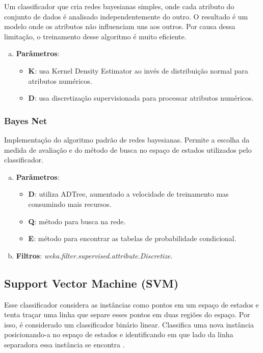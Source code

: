 Um classificador que cria redes bayesianas simples, onde cada atributo do conjunto de dados é analisado independentemente do outro. O resultado é um modelo onde os atributos não influenciam uns aos outros. Por causa dessa limitação, o treinamento desse algoritmo é muito eficiente.

\begin{enumerate}[a)]
    \item \textbf{Parâmetros}:
        \begin{itemize}
            \item \textbf{K}: usa Kernel Density Estimator ao invés de distribuição normal para atributos numéricos.
            \item \textbf{D}: usa discretização supervisionada para processar atributos numéricos.
        \end{itemize}
\end{enumerate}

\subsubsection{Bayes Net}

Implementação do algoritmo padrão de redes bayesianas. Permite a escolha da medida de avaliação e do método de busca no espaço de estados utilizados pelo classificador.

\begin{enumerate}[a)]
    \item \textbf{Parâmetros}:
        \begin{itemize}
            \item \textbf{D}: utiliza ADTree, aumentado a velocidade de treinamento mas consumindo mais recursos.
            \item \textbf{Q}: método para busca na rede.
            \item \textbf{E}: método para encontrar as tabelas de probabilidade condicional.
        \end{itemize}
    \item \textbf{Filtros}: \emph{weka.filter.supervised.attribute.Discretize}.
\end{enumerate}

\subsection{Support Vector Machine (SVM)}

Esse classificador considera as instâncias como pontos em um espaço de estados e tenta traçar uma linha que separe esses pontos em duas regiões do espaço. Por isso, é considerado um classificador binário linear. Classifica uma nova instância posicionando-a no espaço de estados e identificando em que lado da linha separadora essa instância se encontra \cite{Cortes1995}.


